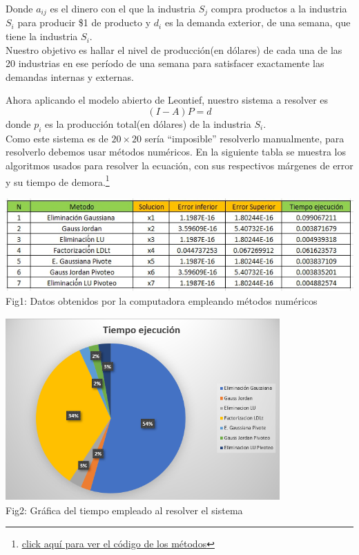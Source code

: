 \documentclass[10pt,a4paper]{article}
\begin{document}
\begin{multicols}{2}
\noindent Donde $a_{ij}$ es el dinero con el que la industria $S_j$ compra productos a la industria $S_i$ para producir \$1 de producto y $d_i$ es la demanda exterior, de una semana, que tiene la industria $S_i$.\\
Nuestro objetivo es hallar el nivel de producción(en dólares) de cada una de las 20 industrias en ese período de una semana para satisfacer exactamente las demandas internas y externas.

\noindent Ahora aplicando el modelo abierto de Leontief, nuestro sistema a resolver es $$(I-A)P=d$$ donde $p_i$ es la producción total(en dólares) de la industria $S_i$.\\
Como este sistema es de $20\times20$ sería ``imposible'' resolverlo manualmente, para resolverlo debemos usar métodos numéricos. En la siguiente tabla se muestra los algoritmos usados para resolver la ecuación, con sus respectivos márgenes de error y su tiempo de demora.\footnote{\href{https://drive.google.com/drive/folders/1F-M1slvs1ibC-nhFcPin_ge0fLCHVb1c?usp=sharing}{\underline{click aquí para ver el código de los métodos}}}
\end{multicols}
\vspace*{1cm}

\begin{center}
	\centering
	\includegraphics[scale=1]{TablasDatos.jpg}
	\\
	Fig1: Datos obtenidos por la computadora empleando métodos numéricos 
\end{center}

\vspace*{1cm}

\begin{center}
	\centering
	\includegraphics[width=10.5cm,height=7cm]{TiempoEjecucion.PNG}
	\\
	Fig2: Gráfica del tiempo empleado al resolver el sistema
	 
\end{center}
\end{document}
